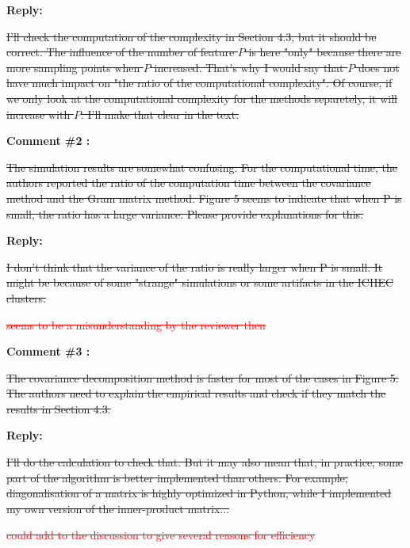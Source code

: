 \documentclass[11pt]{article}
\begin{document}
\medskip

\normalfont

\textbf{Reply:} 

\sout{I'll check the computation of the complexity in Section 4.3, but it should be correct.
The influence of the number of feature $P$ is here "only" because there are more sampling points when $P$ increased. That's why I would say that $P$ does not have much impact on "the ratio of the computational complexity". Of course, if we only look at the computational complexity for the methods separetely, it will increase with $P$. I'll make that clear in the text.}

\bigskip

\itshape


\textbf{Comment \#2 :}

\sout{The simulation results are somewhat confusing. For the computational time, the authors reported the ratio of the computation time between the covariance method and the Gram matrix method. Figure 5 seems to indicate that when P is small, the ratio has a large variance. Please provide explanations for this.}

\medskip

\normalfont

\textbf{Reply:} 

\sout{I don't think that the variance of the ratio is really larger when P is small. It might be because of some "strange" simulations or some artifacts in the ICHEC clusters.}

\textcolor{red}{\sout{seems to be a misunderstanding by the reviewer then}}


\bigskip

\itshape


\textbf{Comment \#3 :}

\sout{The covariance decomposition method is faster for most of the cases in Figure 5. The authors need to explain the empirical results and check if they match the results in Section 4.3.}

\medskip

\normalfont

\textbf{Reply:} 

\sout{I'll do the calculation to check that. But it may also mean that, in practice, some part of the algorithm is better implemented than others. For example, diagonalisation of a matrix is highly optimized in Python, while I implemented my own version of the inner-product matrix...}

\textcolor{red}{\sout{could add to the discussion to give several reasons for efficiency}}
\end{document}
